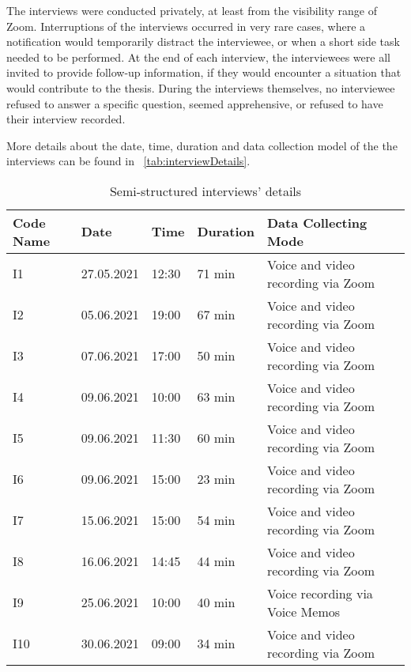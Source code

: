 The interviews were conducted privately, at least from the visibility range of Zoom. Interruptions of the interviews occurred in very rare cases, where a notification would temporarily distract the interviewee, or when a short side task needed to be performed. At the end of each interview, the interviewees were all invited to provide follow-up information, if they would encounter a situation that would contribute to the thesis. During the interviews themselves, no interviewee refused to answer a specific question, seemed apprehensive, or refused to have their interview recorded.

More details about the date, time, duration and data collection model of the the interviews can be found in ~\autoref{tab:interviewDetails}.

\begin{table}[h]
  \caption[Semi-structured interviews' details]{Semi-structured interviews' details}\label{tab:interviewDetails}
  \centering
  \begin{tabular}{ p{} p{}  p{} p{} p{}}
    \toprule
    Code Name  & Date & Time & Duration & Data Collecting Mode \\
    \midrule
     I1  &  27.05.2021 &  12:30 & 71 min & Voice and video recording via Zoom
     \\
      I2  &  05.06.2021 &  19:00 & 67 min & Voice and video recording via Zoom
     \\
      I3  &  07.06.2021 &  17:00 & 50 min & Voice and video recording via Zoom
      \\
      I4  &  09.06.2021 &  10:00 & 63 min & Voice and video recording via Zoom
      \\
      I5  &  09.06.2021 &  11:30 & 60 min & Voice and video recording via Zoom 
     \\
      I6  &  09.06.2021 &  15:00 & 23 min & Voice and video recording via Zoom
     \\
      I7  &  15.06.2021 &  15:00 & 54 min & Voice and video recording via Zoom
     \\
      I8  &  16.06.2021 &  14:45 & 44 min & Voice and video recording via Zoom 
   \\
    I9  &  25.06.2021 &  10:00 & 40 min & Voice recording via Voice Memos
    \\
     I10  &  30.06.2021 &  09:00 & 34 min & Voice and video recording via Zoom
     \\  
    \bottomrule
  \end{tabular}
\end{table}

